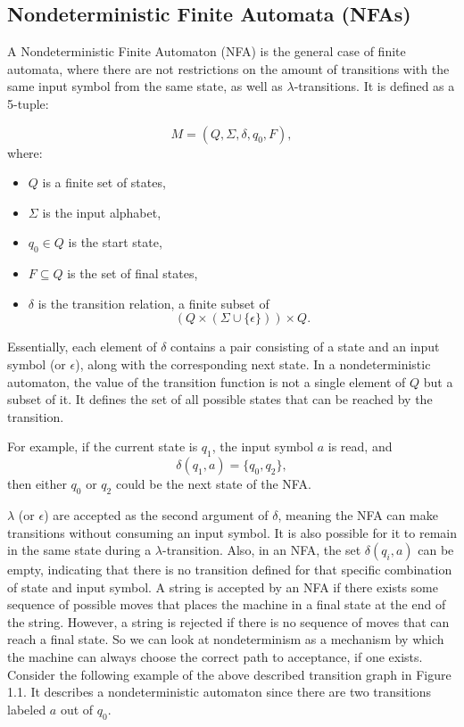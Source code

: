 \subsection{Nondeterministic Finite Automata (NFAs)}

A Nondeterministic Finite Automaton (NFA) is the general case of finite automata, where there are not restrictions on the amount of transitions with
the same input symbol from the same state, as well as \(\lambda\)-transitions. It is defined as a 5-tuple:

\[
M = (Q, \Sigma, \delta, q_0, F),
\]
where:
\begin{itemize}
    \item \(Q\) is a finite set of states,
    \item \(\Sigma\) is the input alphabet,
    \item \(q_0 \in Q\) is the start state,
    \item \(F \subseteq Q\) is the set of final states,
    \item \(\delta\) is the transition relation, a finite subset of
    \[
    (Q \times (\Sigma \cup \{\epsilon\})) \times Q.
    \]
\end{itemize}
Essentially, each element of \(\delta\) contains a pair consisting of a state and an input symbol (or \(\epsilon\)), along with the corresponding next state.
In a nondeterministic automaton, the value of the transition function is not a single element of \(Q\) but a subset of it. 
It  defines the set of all possible states that can be reached by the transition. 

For example, if the current state is \(q_1\), the input symbol \(a\) is read, and
\[
\delta(q_1, a) = \{q_0, q_2\},
\]
then either \(q_0\) or \(q_2\) could be the next state of the NFA. 

\(\lambda\) (or \(\epsilon\)) are accepted as the second argument of \(\delta\), 
meaning the NFA can make transitions without consuming an input symbol. 
It is also possible for it to remain in the same state during a \(\lambda\)-transition.
Also, in an NFA, the set \(\delta(q_i, a)\) can be empty, indicating that there is no transition defined for that specific combination of state and input symbol.
A string is accepted by an NFA if there exists some sequence of possible moves that places the machine in a final state at the end of the string. 
However, a string is rejected if there is no sequence of moves that can reach a final state. So we can look at nondeterminism as a mechanism 
by which the machine can always choose the correct path to acceptance, if one exists.
Consider the following example of the above described transition graph in Figure 1.1. It describes a nondeterministic automaton since there are
two transitions labeled \(a\) out of \(q_0\).

